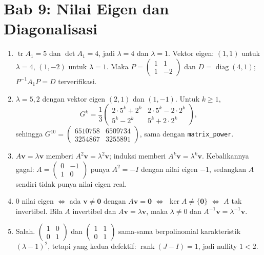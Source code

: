 \section*{Bab 9: Nilai Eigen dan Diagonalisasi}
\begin{enumerate}[label=\textbf{9.\arabic*}]
  \item $\operatorname{tr}A_{1}=5$ dan $\det A_{1}=4$, jadi $\lambda=4$ dan
        $\lambda=1$. Vektor eigen: $(1,1)$ untuk $\lambda=4$, $(1,-2)$ untuk
        $\lambda=1$. Maka $P=\begin{pmatrix}1&1\\1&-2\end{pmatrix}$ dan
        $D=\operatorname{diag}(4,1)$; $P^{-1}A_{1}P=D$ terverifikasi.

  \item $\lambda=5,2$ dengan vektor eigen $(2,1)$ dan $(1,-1)$. Untuk
        $k\ge1$,
        \[
          G^{k}=\frac13
          \begin{pmatrix}2\cdot5^{k}+2^{k}&2\cdot5^{k}-2\cdot2^{k}\\
          5^{k}-2^{k}&5^{k}+2\cdot2^{k}\end{pmatrix},
        \]
        sehingga
        $G^{10}=\begin{pmatrix}6510758&6509734\\3254867&3255891\end{pmatrix}$,
        sama dengan \texttt{matrix\_power}.

  \item $A\mathbf{v}=\lambda\mathbf{v}$ memberi
        $A^{2}\mathbf{v}=\lambda^{2}\mathbf{v}$; induksi memberi
        $A^{k}\mathbf{v}=\lambda^{k}\mathbf{v}$. Kebalikannya gagal:
        $A=\begin{pmatrix}0&-1\\1&0\end{pmatrix}$ punya $A^{2}=-I$ dengan nilai
        eigen $-1$, sedangkan $A$ sendiri tidak punya nilai eigen real.

  \item $0$ nilai eigen $\iff$ ada $\mathbf{v}\ne\mathbf{0}$ dengan
        $A\mathbf{v}=\mathbf{0}$ $\iff$ $\ker A\ne\{\mathbf{0}\}$ $\iff$ $A$ tak
        invertibel. Bila $A$ invertibel dan $A\mathbf{v}=\lambda\mathbf{v}$, maka
        $\lambda\ne0$ dan $A^{-1}\mathbf{v}=\lambda^{-1}\mathbf{v}$.

  \item Salah. $\begin{pmatrix}1&0\\0&1\end{pmatrix}$ dan
        $\begin{pmatrix}1&1\\0&1\end{pmatrix}$ sama-sama berpolinomial
        karakteristik $(\lambda-1)^{2}$, tetapi yang kedua defektif:
        $\operatorname{rank}(J-I)=1$, jadi nullity $1<2$.


\end{enumerate}
